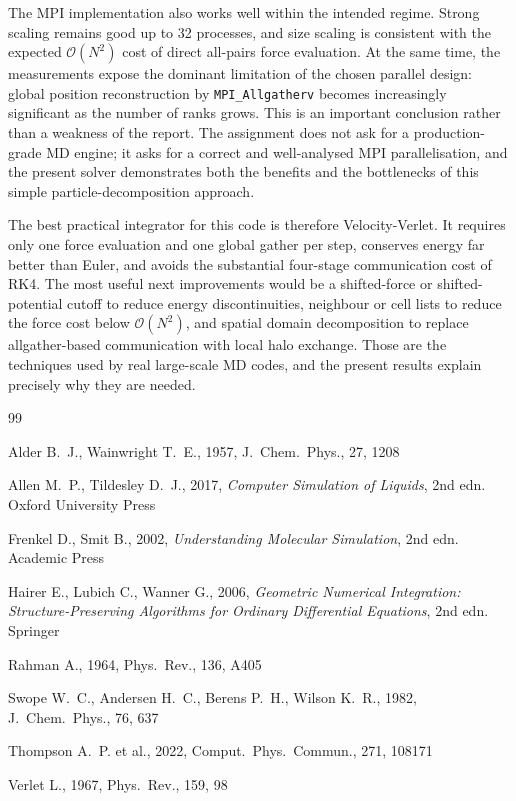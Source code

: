 \documentclass[10pt,twocolumn]{article}
\newcommand{\code}[1]{\texttt{#1}}
\begin{document}
The MPI implementation also works well within the intended regime. Strong scaling remains good up to 32 processes, and size scaling is consistent with the expected $\mathcal{O}(N^2)$ cost of direct all-pairs force evaluation. At the same time, the measurements expose the dominant limitation of the chosen parallel design: global position reconstruction by \code{MPI\_Allgatherv} becomes increasingly significant as the number of ranks grows. This is an important conclusion rather than a weakness of the report. The assignment does not ask for a production-grade MD engine; it asks for a correct and well-analysed MPI parallelisation, and the present solver demonstrates both the benefits and the bottlenecks of this simple particle-decomposition approach.

The best practical integrator for this code is therefore Velocity-Verlet. It requires only one force evaluation and one global gather per step, conserves energy far better than Euler, and avoids the substantial four-stage communication cost of RK4. The most useful next improvements would be a shifted-force or shifted-potential cutoff to reduce energy discontinuities, neighbour or cell lists to reduce the force cost below $\mathcal{O}(N^2)$, and spatial domain decomposition to replace allgather-based communication with local halo exchange. Those are the techniques used by real large-scale MD codes, and the present results explain precisely why they are needed.


\begin{thebibliography}{99}

Alder B.~J., Wainwright T.~E., 1957, J.\ Chem.\ Phys., 27, 1208

Allen M.~P., Tildesley D.~J., 2017, \emph{Computer Simulation of Liquids}, 2nd edn. Oxford University Press

Frenkel D., Smit B., 2002, \emph{Understanding Molecular Simulation}, 2nd edn. Academic Press

Hairer E., Lubich C., Wanner G., 2006, \emph{Geometric Numerical Integration: Structure-Preserving Algorithms for Ordinary Differential Equations}, 2nd edn. Springer

Rahman A., 1964, Phys.\ Rev., 136, A405

Swope W.~C., Andersen H.~C., Berens P.~H., Wilson K.~R., 1982, J.\ Chem.\ Phys., 76, 637

Thompson A.~P. et al., 2022, Comput.\ Phys.\ Commun., 271, 108171

Verlet L., 1967, Phys.\ Rev., 159, 98

\end{thebibliography}
\end{document}
